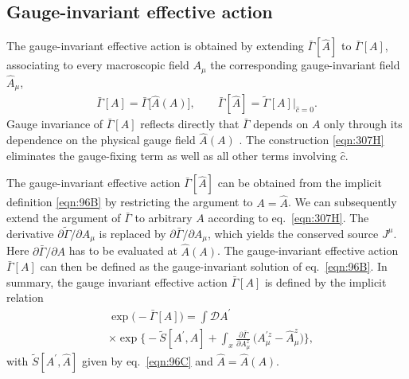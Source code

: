 \documentclass[twocolumn,aps,prd,amsmath,amssymb,preprintnumbers,longbibliography]{revtex4-1}
\numberwithin{equation}{section}
\newenvironment{alignedeqn}{\begin{equation}\begin{aligned}}{\end{aligned}\end{equation}\ignorespacesafterend}
\begin{document}
\subsection{Gauge-invariant effective action}

The gauge-invariant effective action is obtained by extending $\bar\Gamma[\hat{A}]$ to $\bar\Gamma[A]$, associating to every macroscopic field $A_\mu$ the corresponding gauge-invariant field $\hat{A}_\mu$,
\begin{alignedeqn}\label{eqn:307H}
	\bar{\Gamma}[A]
	= \bar{\Gamma}\bigl[\hat{A}(A)\bigr],
	\qquad
	\bar{\Gamma}[\hat{A}]
	= \tilde\Gamma[A]\bigr|_{\hat{c}=0}.
\end{alignedeqn}
Gauge invariance of $\bar\Gamma[A]$ reflects directly that $\bar\Gamma$ depends on $A$ only through its dependence on the physical gauge field $\hat{A}(A)$ \cite{CWGD}. The construction \eqref{eqn:307H} eliminates the gauge-fixing term as well as all other terms involving $\hat{c}$.

The gauge-invariant effective action $\bar\Gamma[\hat{A}]$ can be obtained from the implicit definition \eqref{eqn:96B} by restricting the argument to $A = \hat{A}$. We can subsequently extend the argument of $\bar\Gamma$ to arbitrary $A$ according to eq.~\eqref{eqn:307H}. The derivative $\partial \tilde\Gamma/\partial A_\mu$ is replaced by $\partial \bar\Gamma/\partial A_\mu$, which yields the conserved source $J^\mu$. Here $\partial \bar{\Gamma}/\partial A$ has to be evaluated at $\hat{A}(A)$. The gauge-invariant effective action $\bar\Gamma[A]$ can then be defined as the gauge-invariant solution of eq.~\eqref{eqn:96B}. In summary, the gauge invariant effective action $\bar{\Gamma}[A]$ is defined by the implicit relation
\begin{alignedeqn}\label{eqn:113A}
	&\exp\bigl(-\bar\Gamma[A]\bigr)
	= \int \mathcal{D} A^\prime \, \\
	&\times \exp\biggl\{-\tilde{S}[A^{\prime},\hat{A}]+ \int_x \frac{\partial \bar\Gamma}{\partial A_\mu^z} \, \bigl(A_\mu^{\prime z} - \hat{A}_\mu^z\bigr)\biggr\},
\end{alignedeqn}
with $\tilde{S}[A^{\prime},\hat{A}]$ given by eq.~\eqref{eqn:96C} and $\hat{A}=\hat{A}(A)$.
\end{document}
